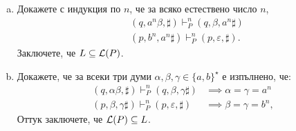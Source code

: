 \begin{example}
  \begin{enumerate}[a)]
  \item
    Докажете с индукция по $n$, че за всяко естествено число $n$,
    \begin{align*}
      & (q, a^n\beta, \sharp) \vdash^n_P (q, \beta, a^n\sharp)\\
      & (p, b^n, a^n\sharp) \vdash^n_P (p, \varepsilon,\sharp).
    \end{align*}
    Заключете, че $L \subseteq \mathcal{L}(P)$.
  \item
    Докажете, че за всеки три думи $\alpha,\beta, \gamma \in \{a,b\}^\star$ е изпълнено, че:
    \begin{align*}
      (q, \alpha\beta, \sharp) \vdash^n_P (q, \beta, \gamma\sharp)  & \implies \alpha = \gamma = a^n\\
      (p, \beta, \gamma\sharp) \vdash^n_P (p, \varepsilon, \sharp) & \implies \beta = \gamma = b^n,
    \end{align*}
    Оттук заключете, че $\mathcal{L}(P) \subseteq L$.    
  \end{enumerate}
\end{example}

